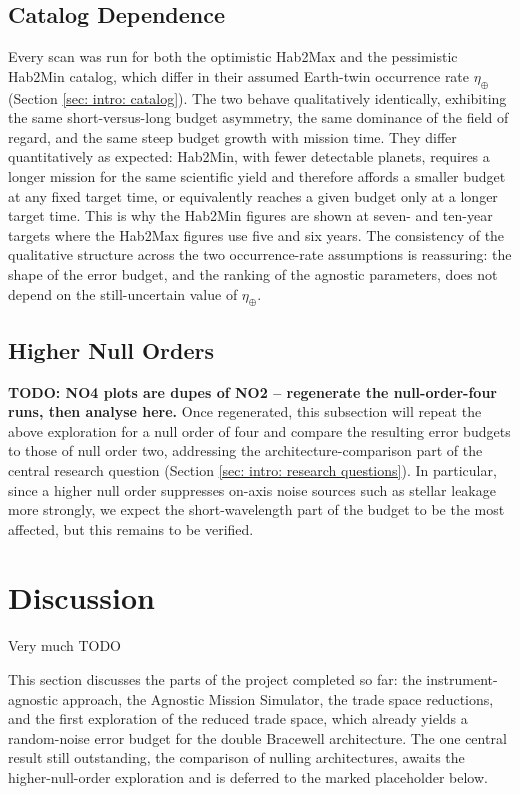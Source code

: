 \documentclass[12pt,a4paper]{article}
\numberwithin{equation}{section}
\numberwithin{figure}{section}
\numberwithin{table}{section}
\begin{document}
\subsection{Catalog Dependence}
Every scan was run for both the optimistic Hab2Max and the pessimistic Hab2Min catalog, which differ in their assumed Earth-twin occurrence rate $\eta_\oplus$ (Section \ref{sec: intro: catalog}). The two behave qualitatively identically, exhibiting the same short-versus-long budget asymmetry, the same dominance of the field of regard, and the same steep budget growth with mission time. They differ quantitatively as expected: Hab2Min, with fewer detectable planets, requires a longer mission for the same scientific yield and therefore affords a smaller budget at any fixed target time, or equivalently reaches a given budget only at a longer target time. This is why the Hab2Min figures are shown at seven- and ten-year targets where the Hab2Max figures use five and six years. The consistency of the qualitative structure across the two occurrence-rate assumptions is reassuring: the shape of the error budget, and the ranking of the agnostic parameters, does not depend on the still-uncertain value of $\eta_\oplus$.

\subsection{Higher Null Orders} \label{sec: tse: null order}
\textbf{TODO: NO4 plots are dupes of NO2 -- regenerate the null-order-four runs, then analyse here.} Once regenerated, this subsection will repeat the above exploration for a null order of four and compare the resulting error budgets to those of null order two, addressing the architecture-comparison part of the central research question (Section \ref{sec: intro: research questions}). In particular, since a higher null order suppresses on-axis noise sources such as stellar leakage more strongly, we expect the short-wavelength part of the budget to be the most affected, but this remains to be verified.

\section{Discussion}

Very much TODO

This section discusses the parts of the project completed so far: the instrument-agnostic approach, the Agnostic Mission Simulator, the trade space reductions, and the first exploration of the reduced trade space, which already yields a random-noise error budget for the double Bracewell architecture. The one central result still outstanding, the comparison of nulling architectures, awaits the higher-null-order exploration and is deferred to the marked placeholder below.
\end{document}

